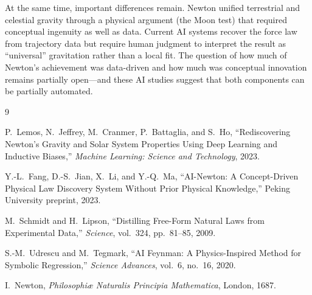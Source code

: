 \documentclass[12pt]{article}
\begin{document}
At the same time, important differences remain.
Newton unified terrestrial and celestial gravity through a physical argument
(the Moon test) that required conceptual ingenuity as well as data.
Current AI systems recover the force law from trajectory data but require
human judgment to interpret the result as ``universal'' gravitation rather
than a local fit.
The question of how much of Newton's achievement was data-driven and how
much was conceptual innovation remains partially open---and these AI
studies suggest that both components can be partially automated.

\begin{thebibliography}{9}

P.~Lemos, N.~Jeffrey, M.~Cranmer, P.~Battaglia, and S.~Ho,
``Rediscovering Newton's Gravity and Solar System Properties Using Deep
Learning and Inductive Biases,''
\textit{Machine Learning: Science and Technology}, 2023.

Y.-L.~Fang, D.-S.~Jian, X.~Li, and Y.-Q.~Ma,
``AI-Newton: A Concept-Driven Physical Law Discovery System Without Prior
Physical Knowledge,''
Peking University preprint, 2023.

M.~Schmidt and H.~Lipson,
``Distilling Free-Form Natural Laws from Experimental Data,''
\textit{Science}, vol.~324, pp.~81--85, 2009.

S.-M.~Udrescu and M.~Tegmark,
``AI Feynman: A Physics-Inspired Method for Symbolic Regression,''
\textit{Science Advances}, vol.~6, no.~16, 2020.

I.~Newton, \textit{Philosophi\ae{} Naturalis Principia Mathematica},
London, 1687.

\end{thebibliography}
\end{document}
